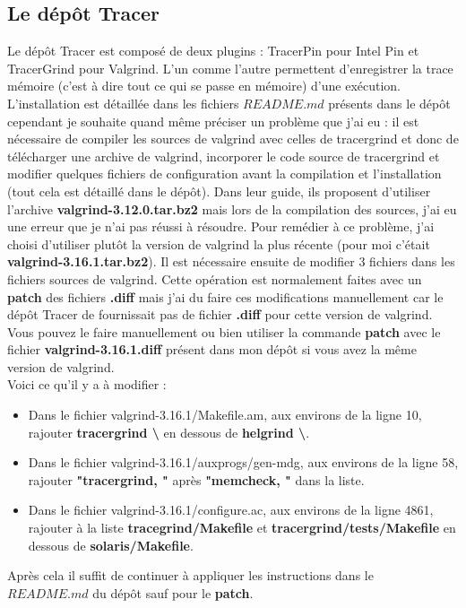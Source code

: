 \documentclass[10pt,a4paper]{article}
\begin{document}
\subsection{Le dépôt Tracer}
Le dépôt Tracer est composé de deux plugins : TracerPin pour Intel Pin et TracerGrind pour Valgrind. L'un comme l'autre permettent d'enregistrer la trace mémoire (c'est à dire tout ce qui se passe en mémoire) d'une exécution. L'installation est détaillée dans les fichiers $README.md$ présents dans le dépôt cependant je souhaite quand même préciser un problème que j'ai eu : il est nécessaire de compiler les sources de valgrind avec celles de tracergrind et donc de télécharger une archive de valgrind, incorporer le code source de tracergrind et modifier quelques fichiers de configuration avant la compilation et l'installation (tout cela est détaillé dans le dépôt). Dans leur guide, ils proposent d'utiliser l'archive \textbf{valgrind-3.12.0.tar.bz2} mais lors de la compilation des sources, j'ai eu une erreur que je n'ai pas réussi à résoudre. Pour remédier à ce problème, j'ai choisi d'utiliser plutôt la version de valgrind la plus récente (pour moi c'était \textbf{valgrind-3.16.1.tar.bz2}). Il est nécessaire ensuite de modifier 3 fichiers dans les fichiers sources de valgrind. Cette opération est normalement faites avec un \textbf{patch} des fichiers \textbf{.diff} mais j'ai du faire ces modifications manuellement car le dépôt Tracer de fournissait pas de fichier \textbf{.diff} pour cette version de valgrind. Vous pouvez le faire manuellement ou bien utiliser la commande \textbf{patch} avec le fichier \textbf{valgrind-3.16.1.diff} présent dans mon dépôt si vous avez la même version de valgrind.\\
Voici ce qu'il y a à modifier :
\begin{itemize}
\item Dans le fichier valgrind-3.16.1/Makefile.am, aux environs de la ligne 10, rajouter \textbf{tracergrind \textbackslash} en dessous de \textbf{helgrind \textbackslash}.
\item Dans le fichier valgrind-3.16.1/auxprogs/gen-mdg, aux environs de la ligne 58, rajouter \textbf{"tracergrind, "} après \textbf{"memcheck, "} dans la liste.
\item Dans le fichier valgrind-3.16.1/configure.ac, aux environs de la ligne 4861, rajouter à la liste \textbf{tracegrind/Makefile} et \textbf{tracergrind/tests/Makefile} en dessous de \textbf{solaris/Makefile}.
\end{itemize}

Après cela il suffit de continuer à appliquer les instructions dans le $README.md$ du dépôt sauf pour le \textbf{patch}.\\
\end{document}
